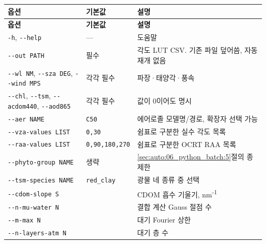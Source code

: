 {\TableFont
\begin{longtable}{@{}>{\raggedright\arraybackslash}p{}>{\raggedright\arraybackslash}p{}>{\raggedright\arraybackslash}p{}@{}}
\toprule
\textbf{옵션} & \textbf{기본값} & \textbf{설명} \\
\midrule
\endfirsthead
\toprule
\textbf{옵션} & \textbf{기본값} & \textbf{설명} \\
\midrule
\endhead
\bottomrule
\endfoot
\texttt{-\allowbreak{}h}, \texttt{-\allowbreak{}-\allowbreak{}help} & --- & 도움말 \\
\texttt{-\allowbreak{}-\allowbreak{}out PATH} & 필수 & 각도 LUT CSV. 기존 파일 덮어씀, 자동 재개 없음 \\
\texttt{-\allowbreak{}-\allowbreak{}wl NM}, \texttt{-\allowbreak{}-\allowbreak{}sza DEG}, \texttt{-\allowbreak{}-\allowbreak{}wind MPS} & 각각 필수 & 파장·태양각·풍속 \\
\texttt{-\allowbreak{}-\allowbreak{}chl}, \texttt{-\allowbreak{}-\allowbreak{}tsm}, \texttt{-\allowbreak{}-\allowbreak{}acdom440}, \texttt{-\allowbreak{}-\allowbreak{}aod865} & 각각 필수 & 값이 0이어도 명시 \\
\texttt{-\allowbreak{}-\allowbreak{}aer NAME} & \texttt{C50} & 에어로졸 모델명/경로, 확장자 선택 가능 \\
\texttt{-\allowbreak{}-\allowbreak{}vza-\allowbreak{}values LIST} & \texttt{0,\allowbreak{}30} & 쉼표로 구분한 실수 각도 목록 \\
\texttt{-\allowbreak{}-\allowbreak{}raa-\allowbreak{}values LIST} & \texttt{0,\allowbreak{}90,\allowbreak{}180,\allowbreak{}270} & 쉼표로 구분한 OCRT RAA 목록 \\
\texttt{-\allowbreak{}-\allowbreak{}phyto-\allowbreak{}group NAME} & 생략 & \ref{sec:auto:06_python_batch:5}절의 종 제한 \\
\texttt{-\allowbreak{}-\allowbreak{}tsm-\allowbreak{}species NAME} & \texttt{red\_\allowbreak{}clay} & 광물 네 종류 중 선택 \\
\texttt{-\allowbreak{}-\allowbreak{}cdom-\allowbreak{}slope S} & 0.014 & CDOM 흡수 기울기, nm\textsuperscript{-}\textsuperscript{1} \\
\texttt{-\allowbreak{}-\allowbreak{}n-\allowbreak{}mu-\allowbreak{}water N} & 48 & 결합 계산 Gauss 절점 수 \\
\texttt{-\allowbreak{}-\allowbreak{}m-\allowbreak{}max N} & 16 & 대기 Fourier 상한 \\
\texttt{-\allowbreak{}-\allowbreak{}n-\allowbreak{}layers-\allowbreak{}atm N} & 400 & 대기 층 수 \\

\end{longtable}}
